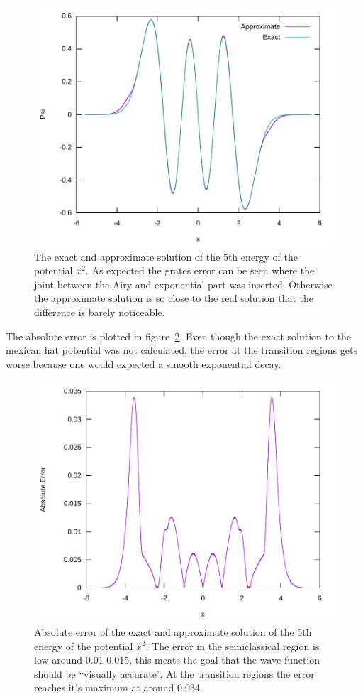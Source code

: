 \documentclass[11pt,DIV=10,final]{scrreprt} %
\begin{document}
\begin{figure}[H]
  \centering
  \includegraphics[width=\textwidth]{plots/approx_vs_exact_wave_square_5.pdf}
  \caption{\label{fig:approx-vs-exact} The exact and approximate solution of the 5th energy of the potential $x^{2}$. As expected the grates error can be seen where the joint between the Airy and
    exponential part was inserted. Otherwise the approximate solution is so close to the real solution that the difference is barely noticeable.}
\end{figure}
The absolute error is plotted in figure~\ref{fig:absolute-error}. Even though the exact solution to the mexican hat potential was not calculated, the error at the transition regions gets worse because
one would expected a smooth exponential decay.
\begin{figure}[H]
  \centering
  \includegraphics[width=\textwidth]{plots/absolute_error_square_5.pdf}
  \caption{\label{fig:absolute-error} Absolute error of the exact and approximate solution of the 5th energy of the potential $x^{2}$. The error in the semiclassical region is low around 0.01-0.015, this
    meats the goal that the wave function should be ``visually accurate''. At the transition regions the error reaches it's maximum at around 0.034.}
\end{figure}
\end{document}
